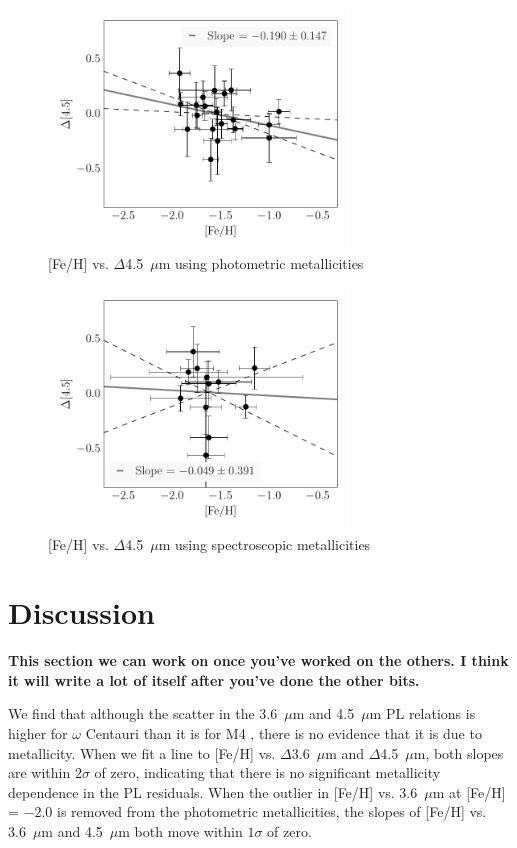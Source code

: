 \documentclass[a4paper,fleqn,usenatbib]{mnras}
\begin{document}
\begin{figure}
\begin{center}
\includegraphics[width=80mm]{final_plots/delta_feh_4p5_phot.pdf}
\caption{[Fe/H] vs. $\Delta$4.5~$\mu$m using photometric metallicities}
\label{fig:delta_4p5_phot}
\end{center}
\end{figure}

\begin{figure}
\begin{center}
\includegraphics[width=80mm]{final_plots/delta_feh_4p5_spect.pdf}
\caption{[Fe/H] vs. $\Delta$4.5~$\mu$m using spectroscopic metallicities}
\label{fig:delta_4p5_spect}
\end{center}
\end{figure}


\section{Discussion}
\label{sec:discussion}

{\bf This section we can work on once you've worked on the others. I think it will write a lot of itself after you've done the other bits.}

We find that although the scatter in the 3.6~$\mu$m and 4.5~$\mu$m PL relations is higher for $\omega$ Centauri than it is for M4 \citep{2015arXiv150507858N}, there is no evidence that it is due to metallicity. When we fit a line to [Fe/H] vs. $\Delta$3.6~$\mu$m and $\Delta$4.5~$\mu$m, both slopes are within $2\sigma$ of zero, indicating that there is no significant metallicity dependence in the PL residuals. When the outlier in [Fe/H] vs. 3.6~$\mu$m at [Fe/H] = $-2.0$ is removed from the photometric metallicities, the slopes of [Fe/H] vs. 3.6~$\mu$m and 4.5~$\mu$m both move within $1\sigma$ of zero.
\end{document}
